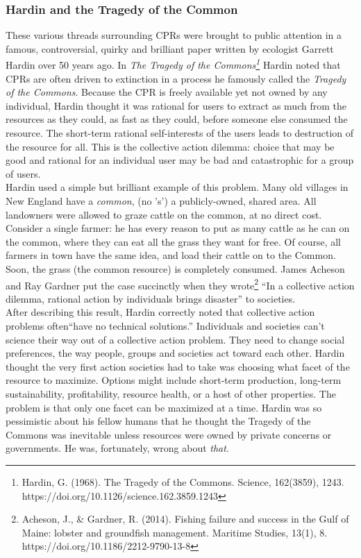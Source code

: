 \documentclass[amstex,12pt]{book}
\begin{document}
\subsubsection{Hardin and the Tragedy of the Common} 
These various threads surrounding CPRs were brought to public attention in a famous, controversial, quirky and brilliant paper written by ecologist Garrett Hardin over 50 years ago. In \textit{The Tragedy of the Commons\footnote{Hardin, G. (1968). The Tragedy of the Commons. Science, 162(3859), 1243. https://doi.org/10.1126/science.162.3859.1243}} Hardin noted that CPRs are often driven to extinction in a process he famously called the \textit{Tragedy of the Commons}. Because the CPR is freely available yet not owned by any individual, Hardin thought it was rational for users to extract as much from the resources as they could, as fast as they could, before someone else consumed the resource. The short-term rational self-interests of the users leads to destruction of the resource for all. This is the collective action dilemma: choice that may be good and rational for an individual user may be bad and catastrophic for a group of users. \\

Hardin used a simple but brilliant example of this problem. Many old villages in New England have a \emph{common}, (no 's') a publicly-owned, shared area. All landowners were allowed to graze cattle on the common, at no direct cost. Consider a single farmer: he has every reason to put as many cattle as he can on the common, where they can eat all the grass they want for free. Of course, all farmers in town have the same idea, and load their cattle on to the Common. Soon, the grass (the common resource) is completely consumed. James Acheson and Ray Gardner put the case succinctly when they wrote\footnote{Acheson, J., \& Gardner, R. (2014). Fishing failure and success in the Gulf of Maine: lobster and groundfish management. Maritime Studies, 13(1), 8. https://doi.org/10.1186/2212-9790-13-8} ``In a collective action dilemma, rational action by individuals brings disaster'' to societies.\\

After describing this result, Hardin correctly noted that collective action problems often``have no technical solutions.'' Individuals and societies can't science their way out of a collective action problem. They need to change social preferences, the way people, groups and societies act toward each other. Hardin thought the very first action societies had to take was choosing what facet of the resource to maximize.  Options might include short-term production, long-term sustainability, profitability, resource health, or a host of other properties. The problem is that only one facet can be maximized at a time. Hardin was so pessimistic about his fellow humans that he thought the Tragedy of the Commons was inevitable unless resources were owned by private concerns or governments. He was, fortunately, wrong about \emph{that}.\\
\end{document}
